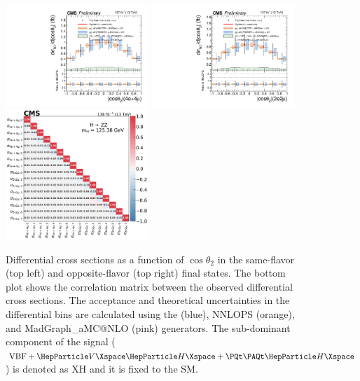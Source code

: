 \clearpage

\begin{center}
	\begin{figure}[!htb]
		\centering
		\includegraphics[width=0.48\textwidth]{Images/H4L/angles/model_v4/costhetaZ2_unfoldwith_4l_SM_125_asimov.pdf}
		\includegraphics[width=0.48\textwidth]{Images/H4L/angles/model_v4/costhetaZ2_unfoldwith_2e2mu_SM_125_asimov.pdf} \\
		\includegraphics[width=0.48\textwidth]{Images/H4L/correlations/corr_costhetaZ2_v4.pdf} \\
		\caption{
			Differential cross sections as a function of  $\cos \theta_\text{2}$ in the same-flavor (top left) and opposite-flavor (top right)  final states.
			The bottom plot shows the correlation matrix between the observed differential cross sections.
			The acceptance and theoretical uncertainties in the differential bins are calculated using the \POWHEG (blue), NNLOPS (orange), and MadGraph\_aMC@NLO (pink) generators.
			The sub-dominant component of the signal ($\VBF + \VH + \ttH$) is denoted as XH and it is fixed to the SM.
			\label{fig:fidCOSZ2}}
	\end{figure}
\end{center}

